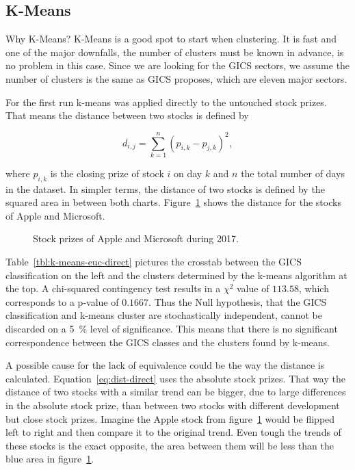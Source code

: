
\subsection{K-Means}\label{sec:k-means}


Why K-Means? K-Means is a good spot to start when clustering. It is fast and one of the major downfalls, the number of clusters must be known in advance, is no problem in this case. Since we are looking for the GICS sectors, we assume the number of clusters is the same as GICS proposes, which are eleven major sectors. 

For the first run k-means was applied directly to the untouched stock prizes. That means the distance between two stocks is defined by

\begin{equation}\label{eq:dist-direct}
d_{i,j} = \sum^{n}_{k = 1} {(p_{i,k} - p_{j,k})^2},
\end{equation}

where $p_{i,k}$ is the closing prize of stock $i$ on day $k$ and $n$ the total number of days in the dataset. In simpler terms, the distance of two stocks is defined by the squared area in between both charts. Figure~\ref{fig:appl-vs-msft} shows the distance for the stocks of Apple and Microsoft.

\begin{figure}\label{fig:appl-vs-msft}
	\centering
	
	\caption{Stock prizes of Apple and Microsoft during 2017.}
\end{figure}



Table~\ref{tbl:k-means-euc-direct} pictures the crosstab between the GICS classification on the left and the clusters determined by the k-means algorithm at the top. A chi-squared contingency test results in a $\chi^2$ value of $113.58$, which corresponds to a p-value of $0.1667$. Thus the Null hypothesis, that the GICS classification and k-means cluster are stochastically independent, cannot be discarded on a 5~\% level of significance. This means that there is no significant correspondence between the GICS classes and the clusters found by k-means.

A possible cause for the lack of equivalence could be the way the distance is calculated. Equation~\ref{eq:dist-direct} uses the absolute stock prizes. That way the distance of two stocks with a similar trend can be bigger, due to large differences in the absolute stock prize, than between two stocks with different development but close stock prizes. Imagine the Apple stock from figure~\ref{fig:appl-vs-msft} would be flipped left to right and then compare it to the original trend. Even tough the trends of these stocks is the exact opposite, the area between them will be less than the blue area in figure~\ref{fig:appl-vs-msft}.

